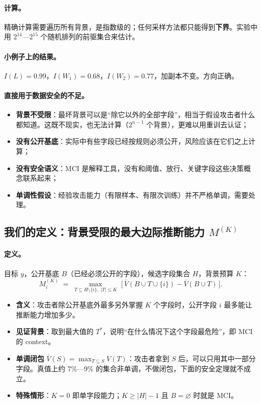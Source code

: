 \documentclass[zihao=-4,a4paper]{ctexart}
\newcommand{\M}{M^{(K)}}
\begin{document}
\paragraph{计算。}精确计算需要遍历所有背景，是指数级的；任何采样方法都只能得到\textbf{下界}。实验中用 $2^{14}$—$2^{15}$ 个随机排列的前驱集合来估计。

\paragraph{小例子上的结果。}$I(L)=0.99$，$I(W_1)=0.68$，$I(W_2)=0.77$，加副本不变。方向正确。

\paragraph{直接用于数据安全的不足。}
\begin{itemize}[leftmargin=*]
  \item \textbf{背景不受限}：最坏背景可以是“除它以外的全部字段”，相当于假设攻击者什么都知道。这既不现实，也无法计算（$2^{n-1}$ 个背景），更难以用重训去认证；
  \item \textbf{没有公开基底}：实际中有些字段已经按规则必须公开，风险应该在它们之上计算；
  \item \textbf{没有安全语义}：MCI 是解释工具，没有和阈值、放行、关键字段这些决策概念联系起来；
  \item \textbf{单调性假设}：经验攻击能力（有限样本、有限次训练）并不严格单调，需要处理。
\end{itemize}

\subsection{我们的定义：背景受限的最大边际推断能力 $\M$}

\paragraph{定义。}目标 $y$，公开基底 $B$（已经必须公开的字段），候选字段集合 $H$，背景预算 $K$：
\[
  M^{(K)}_{i} \;=\; \max_{T\subseteq H\setminus\{i\},\;|T|\le K}\;\Big[\,\bar V(B\cup T\cup\{i\})-\bar V(B\cup T)\,\Big].
\]
\begin{itemize}[leftmargin=*]
  \item \textbf{含义}：攻击者除公开基底外最多另外掌握 $K$ 个字段时，公开字段 $i$ 最多能让推断能力增加多少。
  \item \textbf{见证背景}：取到最大值的 $T^{*}$，说明“在什么情况下这个字段最危险”，即 MCI 的 context。
  \item \textbf{单调闭包} $\bar V(S)=\max_{T\subseteq S}V(T)$：攻击者拿到 $S$ 后，可以只用其中一部分字段。真值上约 7\%—9\% 的集合非单调，不做闭包，下面的安全定理就不成立。
  \item \textbf{特殊情形}：$K=0$ 即单字段能力；$K\ge|H|-1$ 且 $B=\varnothing$ 时就是 MCI。
\end{itemize}
\end{document}
